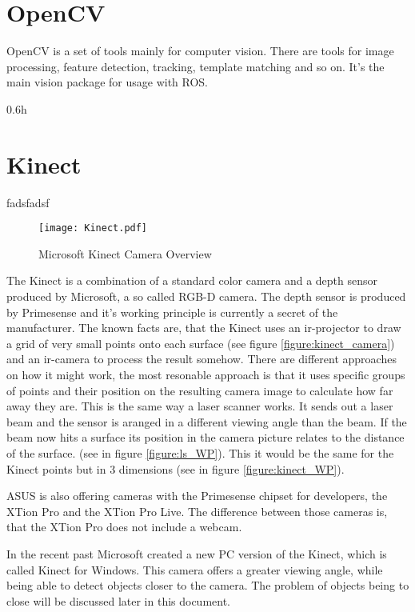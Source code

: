 
\clearpage

\section{OpenCV}
OpenCV is a set of tools mainly for computer vision. There are tools for image processing, feature detection, tracking,
template matching and so on. It's the main vision package for usage with ROS.

{0.6}{h}

\section{Kinect}
fadsfadsf 
\begin{figure}[htp]
	\centering
	\texttt{[image: Kinect.pdf]}
	\caption{Microsoft Kinect Camera Overview}
	\label{figure:kinect_camera}
\end{figure}

The Kinect is a combination of a standard color camera and a depth sensor produced by Microsoft, a so called RGB-D camera. 
The depth sensor is produced by Primesense and it's working principle is currently a secret of the manufacturer. 
The known facts are, that the Kinect uses an ir-projector to draw a grid of very small points onto each surface 
(see figure \vref{figure:kinect_camera}) and an ir-camera to process the result somehow.  
There are different approaches on how it might work, the most resonable approach is that it uses 
specific groups of points and their position on the resulting camera image to calculate how far 
away they are. This is the same way a laser scanner works. 
It sends out a laser beam and the sensor is aranged in a different viewing angle than the beam.
If the beam now hits a surface its position in the camera picture relates to the distance of the surface.
(see in figure \vref{figure:ls_WP}). This it would be the same for the Kinect points but in 3 dimensions 
(see in figure \vref{figure:kinect_WP}).

ASUS is also offering cameras with the Primesense chipset for developers, the XTion Pro and the XTion Pro Live.
The difference between those cameras is, that the XTion Pro does not include a webcam.

In the recent past Microsoft created a new PC version of the Kinect, which is called Kinect for Windows.
This camera offers a greater viewing angle, while being able to detect objects closer to the camera.
The problem of objects being to close will be discussed later in this document.

